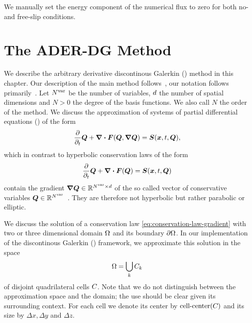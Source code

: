We manually set the energy component of the numerical flux to zero for both no- and free-slip conditions.
\section{The ADER-DG Method}\label{sec:ader-dg}
We describe the arbitrary derivative discontinous Galerkin (\aderdg) method in this chapter.
Our description of the main method follows~\cite{dumbser2008unified,dumbser2010arbitrary,dumbser2018efficient}, our notation follows primarily~\cite{dumbser2018efficient}.
Let $N^{\text{var}}$ be the number of variables, $d$ the number of spatial dimensions and $N > 0$ the degree of the basis functions.
We also call $N$ the order of the method.
We discuss the approximation of systems of partial differential equations (\pde) of the form
\begin{equation}
  \label{eq:conservation-law-gradient}
 \frac{\partial}{\partial_t}  \Q + \div \flux(\Q, \gradQ) = \source(\bm{x}, t, \Q),
\end{equation}
which in contrast to hyperbolic conservation laws of the form
\begin{equation}
  \label{eq:conservation-law}
 \frac{\partial}{\partial_t}  \Q + \div \flux(\Q) = \source(\bm{x}, t, \Q)
\end{equation}
contain the gradient $\gradQ \in \mathbb{R}^{\NVar \times \dimensions}$ of the so called vector of conservative variables $\bm{Q} \in \mathbb{R}^{N^{\text{var}}}$~\cite{dumbser2010arbitrary}.
They are therefore not hyperbolic but rather parabolic or elliptic.

We discuss the solution of a conservation law \cref{eq:conservation-law-gradient} with two or three dimensional domain $\Omega$ and its boundary $\partial \Omega$.
In our implementation of the discontinous Galerkin (\dg) framework, we approximate this solution in the space
\begin{equation}
  \label{eq:dg-space}
  \broken = \bigcup_k \cell[k]
\end{equation}
of disjoint quadrilateral cells $C_{}$.
Note that we do not distinguish between the approximation space and the domain; the use should be clear given its surrounding context.
For each cell we denote its center by $\operatorname{cell-center} (C_{})$ and its size by $\Delta x, \Delta y$ and $\Delta z$.


